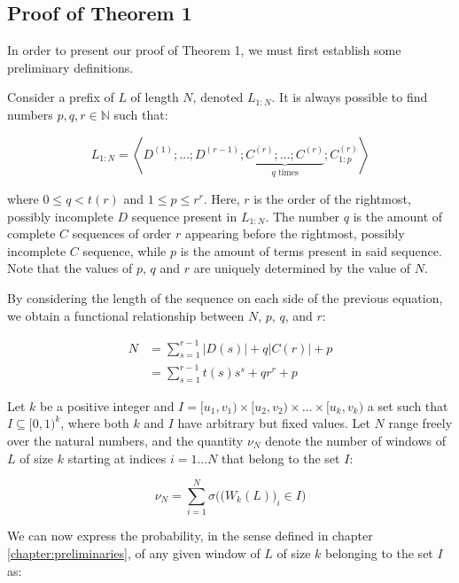 \documentclass[11pt,a4paper]{tesis}
\theoremstyle{plain}
\theoremstyle{definition}
\begin{document}
\subsection{Proof of Theorem 1}

In order to present our proof of Theorem 1, we must first establish some preliminary definitions.

Consider a prefix of $L$ of length $N$, denoted $L_{1 : N}$. It is always possible to find numbers $p, q, r \in \mathbb{N}$ such that:

\begin{equation*}
  L_{1:N} = \left< D^{(1)} ; \dots ; D^{(r - 1)} ; \underbrace{C^{(r)} ; \dots ; C^{(r)}}_{q \text{ times}} ; C^{(r)}_{1:p} \right>
\end{equation*}

where $0 \le q < t(r)$ and $1 \le p \le r^r$. Here, $r$ is the order of the rightmost, possibly incomplete $D$ sequence present in $L_{1:N}$. The number $q$ is the amount of complete $C$ sequences of order $r$ appearing before the rightmost, possibly incomplete $C$ sequence, while $p$ is the amount of terms present in said sequence. Note that the values of $p$, $q$ and $r$ are uniquely determined by the value of $N$.

By considering the length of the sequence on each side of the previous equation, we obtain a functional relationship between $N$, $p$, $q$, and $r$:

\begin{equation}\label{equation:n-p-q-r}
  \begin{aligned}
    N & = \sum_{s = 1}^{r - 1} |D(s)| + q |C(r)| + p \\
      & = \sum_{s = 1}^{r - 1} t(s) s^s + q r^r + p
  \end{aligned}
\end{equation}

Let $k$ be a positive integer and $I = [u_1, v_1) \times [u_2, v_2) \times \dots \times [u_k, v_k)$ a set such that $I \subseteq [0, 1)^k$, where both $k$ and $I$ have arbitrary but fixed values. Let $N$ range freely over the natural numbers, and the quantity $\nu_N$ denote the number of windows of $L$ of size $k$ starting at indices $i = 1 \dots N$ that belong to the set $I$:

\begin{equation*}
  \nu_N = \sum_{i = 1}^{N} \sigma\Big( \big( W_k(L) \big)_i \in I \Big)
\end{equation*}

We can now express the probability, in the sense defined in chapter \ref{chapter:preliminaries}, of any given window of $L$ of size $k$ belonging to the set $I$ as:
\end{document}
